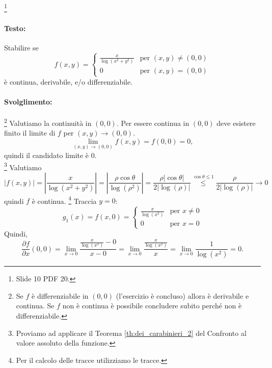 \begin{example}
	 \footnote{Slide 10 PDF 20.}
	\paragraph{Testo:}
	Stabilire se
	\begin{equation*}
		f(x,y)=
		\begin{cases}
			\frac{x}{\log(x^2+y^2)}&\text{per }(x,y)\neq(0,0)\\
			0 &\text{per } (x,y)=(0,0)
		\end{cases}
	\end{equation*}
	è continua, derivabile, e/o differenziabile.
	\paragraph{Svolglimento:} 
	\footnote{Se $f$ è differenziabile in $(0,0)$ (l'esercizio è concluso) allora è derivabile e continua. Se $f$ non è continua è possibile concludere subito perché non è differenziabile.}
	Valutiamo la continuità in $(0,0)$. Per essere continua in $(0,0)$ deve esistere finito il limite di $f$ per $(x,y)\rightarrow(0,0)$.
	\begin{equation*}
		\lim_{(x,y) \rightarrow(0,0)} f(x,y)=f(0,0)=0,
	\end{equation*}
	quindi il candidato limite è 0.\\
	\footnote{Proviamo ad applicare il Teorema \ref{th:dei_carabinieri_2} del Confronto al valore assoluto della funzione.} Valutiamo
	\begin{equation*}
		|f(x,y)| = \left|\frac{x}{\log(x^2+y^2)}\right| =\left|\frac{\rho\cos\theta}{\log(\rho^2)}\right| = \frac{\rho|\cos\theta|}{2|\log(\rho)|} \overset{\cos\theta\leq1}{\leq}\frac{\rho}{2|\log(\rho)|}\rightarrow 0
	\end{equation*}
	quindi $f$ è continua.
	\footnote{Per il calcolo delle tracce utilizziamo le tracce.} Traccia $y=0$:
	\begin{equation*}
		g_1(x) = f(x,0) =
		\begin{cases}
			\frac{x}{\log(x^2)} &\text{per } x\neq 0\\
			0 &\text{per } x=0
		\end{cases}
	\end{equation*}
	Quindi,
	\begin{equation*}
		\frac{\partial f}{\partial x}(0,0) = \lim_{x\rightarrow 0}\frac{\frac{x}{\log(x^2)} - 0}{x - 0} = \lim_{x\rightarrow 0}\frac{\frac{x}{\log(x^2)}}{x} = \lim_{x\rightarrow 0} \frac{1}{\log(x^2)} = 0.

\end{equation*}
\end{example}
